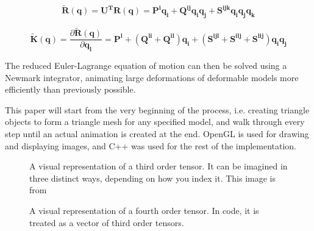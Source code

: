 \documentclass[twocolumn,10pt]{asme2ej}
\begin{document}
\begin{equation}
\bm{\tilde{R}}(\bm{q}) = \bm{U^{T}R}(\bm{q}) = \bm{P^{i}q_{i}} + \bm{Q^{ij}q_{i}q_{j}} + \bm{S^{ijk}q_{i}q_{j}q_{k}}
\label{eq_rcubicpoly}
\end{equation}

\begin{equation}
\bm{\tilde{K}}(\bm{q}) = \frac{\partial \bm{\tilde{R}}(\bm{q})}{\partial \bm{q_{l}}} = \bm{P^{l}} + (\bm{Q^{li}} + \bm{Q^{il}})\bm{q_{i}} + (\bm{S^{ijl}} + \bm{S^{ilj}} + \bm{S^{lij}} )\bm{q_{i}q_{j}}
\label{eq_rquadpoly}
\end{equation}

The reduced Euler-Lagrange equation of motion can then be solved using a Newmark integrator, animating large deformations
of deformable models more efficiently than previously possible.

This paper will start from the very beginning of the process, i.e. creating triangle objects to form a triangle mesh for any
specified model, and walk through every step until an actual animation is created at the end. OpenGL is used for drawing and displaying images, and C++ was used for the rest of the implementation.

\begin{figure}
\caption{A visual representation of a third order tensor. It can be imagined in three distinct ways, depending on how you index it. This image is from \cite{tensors}}
\label{fig_ex1.png}
\end{figure}
\begin{figure}
\caption{A visual representation of a fourth order tensor. In code, it is treated as a vector of third order tensors.}
\label{fig_ex2.png}
\end{figure}
\end{document}
